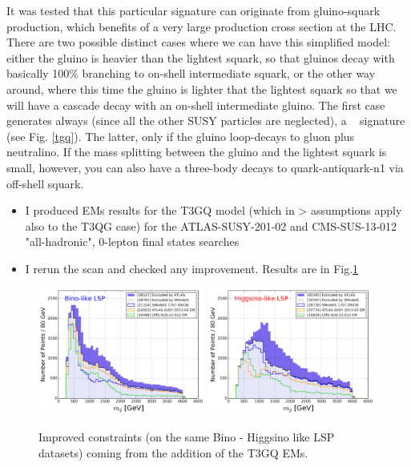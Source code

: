 \documentclass[a4paper,11pt]{article}
\begin{document}
It was tested that this particular signature can originate from gluino-squark production, which benefits of a very large production cross section at the LHC. There are two possible distinct cases where we can have this simplified model: either the gluino is heavier than the lightest squark, so that gluinos decay with basically 100$\%$ branching to on-shell intermediate squark, or the other way around, where this time the gluino is lighter that the lightest squark so that we will have a cascade decay with an on-shell intermediate gluino. The first case generates always (since all the other SUSY particles are neglected), a \jmet~ signature (see Fig. \ref{tgq}). The latter, only if the gluino loop-decays to gluon plus neutralino. If the mass splitting between the gluino and the lightest squark is small, however, you can also have a three-body decays to quark-antiquark-n1 via off-shell squark. 
\\


\begin{itemize}
\item I produced EMs results for the T3GQ model (which in \SMO> assumptions apply also to the T3QG case)
for the ATLAS-SUSY-201-02 and CMS-SUS-13-012 "all-hadronic", 0-lepton final states searches
\item I rerun the scan and checked any improvement. Results are in Fig.\ref{improved}
\end{itemize}




\begin{figure}[!b]
	\centering
	\subfigure
	{ \includegraphics[width=0.49\textwidth]{Fig/TGQ/Bino_TOTAL_COMPARISONOLD_Histo.png}}
	\subfigure
	{\includegraphics[width=0.49\textwidth]{Fig/TGQ/Higgsino_TOTAL_COMPARISONOLD_Histo.png}}
	\caption{Improved constraints (on the same Bino - Higgsino like LSP datasets) coming from the addition of the T3GQ EMs.}
\label{improved}
\end{figure}
\end{document}
